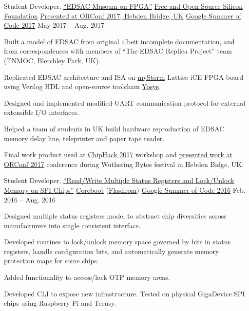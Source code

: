 \begin{cvexperience}
\cvposition
	{Student Developer, \href{https://github.com/librecores/gsoc-museum-edsac}{``EDSAC Museum on FPGA''}} %
	{\href{https://fossi-foundation.org}{Free and Open Source Silicon Foundation}} %
	{\href{https://orconf.org/2017/\#edsac}{Presented at ORConf 2017, Hebden Bridge, UK}} %
	{\href{https://summerofcode.withgoogle.com/archive/2017/projects/6470218444439552/}{Google Summer of Code 2017}} %
	{May 2017 -- Aug. 2017} %
	{\begin{cvitems} %
		\item {Built a model of EDSAC from original albeit incomplete documentation, and from correspondences with members of ``The EDSAC Replica Project'' team (TNMOC, Bletchley Park, UK).}
		\item {Replicated EDSAC architecture and ISA on \href{https://mystorm.uk/}{myStorm} Lattice iCE FPGA board using Verilog HDL and open-source toolchain \href{http://www.clifford.at/yosys/}{Yosys}.}
		\item {Designed and implemented modified-UART communication protocol for external extensible I/O interfaces.}
		\item {Helped a team of students in UK build hardware reproduction of EDSAC memory delay line, teleprinter and paper tape reader.}
		\item {Final work product used at \href{http://chiphack.org/chiphack-2017.html}{ChipHack 2017} workshop and \href{https://youtu.be/EZkJOyOcYiY}{presented work at ORConf 2017} conference during Wuthering Bytes festival in Hebden Bidge, UK.}
	\end{cvitems}}

\cvposition
	{Student Developer, \href{https://drive.google.com/drive/u/1/folders/0B-Cccp-WWmeuUlh5M3pxT0cyQm8}{``Read/Write Multiple Status Registers and Lock/Unlock Memory on SPI Chips''}} %
	{\href{https://www.coreboot.org}{Coreboot} (\href{https://www.flashrom.org/Flashrom}{Flashrom})} %
	{} %
	{\href{https://summerofcode.withgoogle.com/archive/2016/projects/5439533130711040/}{Google Summer of Code 2016}} %
	{Feb. 2016 -- Aug. 2016} %
	{\begin{cvitems} %
		\item {Designed multiple status registers model to abstract chip diversities across manufacturers into single consistent interface.}
		\item {Developed routines to lock/unlock memory space governed by bits in status registers, handle configuration bits, and automatically generate memory protection maps for some chips.}
		\item {Added functionality to access/lock OTP memory areas.}
		\item {Developed CLI to expose new infrastructure. Tested on physical GigaDevice SPI chips using Raspberry Pi and Teensy.}
	\end{cvitems}}


\end{cvexperience}
